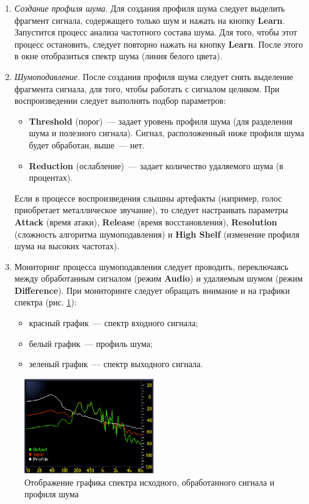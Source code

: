 \documentclass[oneside, final, 14pt]{extreport}
\begin{document}
\begin{enumerate}
  \item \emph{Создание профиля шума}. Для создания профиля шума следует выделить фрагмент сигнала, содержащего только шум и нажать на кнопку \textbf{Learn}. Запустится процесс анализа частотного состава шума. Для того, чтобы этот процесс остановить, следует повторно нажать на кнопку \textbf{Learn}. После этого в окне отобразиться спектр шума (линия белого цвета).
  \item \emph{Шумоподавление}. После создания профиля шума следует снять выделение фрагмента сигнала, для того, чтобы работать с сигналом целиком. При воспроизведении следует выполнять подбор параметров:
      \begin{itemize}
        \item \textbf{Threshold} (порог)~--- задает уровень профиля шума (для разделения шума и полезного сигнала). Сигнал, расположенный ниже профиля шума будет обработан, выше~--- нет.
        \item \textbf{Reduction} (ослабление)~--- задает количество удаляемого шума (в процентах).
      \end{itemize}
      Если в процессе воспроизведения слышны артефакты (например, голос приобретает металлическое звучание), то следует настраивать параметры \textbf{Attack} (время атаки), \textbf{Release} (время восстановления), \textbf{Resolution} (сложность алгоритма шумоподавления) и \textbf{High Shelf} (изменение профиля шума на высоких частотах).
  \item Мониторинг процесса шумоподавления следует проводить, переключаясь между обработанным сигналом (режим \textbf{Audio}) и удаляемым шумом (режим \textbf{Difference}). При мониторинге следует обращать внимание и на графики спектра (рис. \ref{pic-xnoise-02}):
      \begin{itemize}
        \item красный график~--- спектр входного сигнала;
        \item белый график~--- профиль шума;
        \item зеленый график~--- спектр выходного сигнала.
      \end{itemize}
\end{enumerate}

\begin{figure}[h]
    \centering
    \includegraphics[width=0.5\textwidth]{pic-xnoise-02}
    \caption{Отображение графика спектра исходного, обработанного сигнала и профиля шума}
    \label{pic-xnoise-02}
\end{figure}
\end{document}
